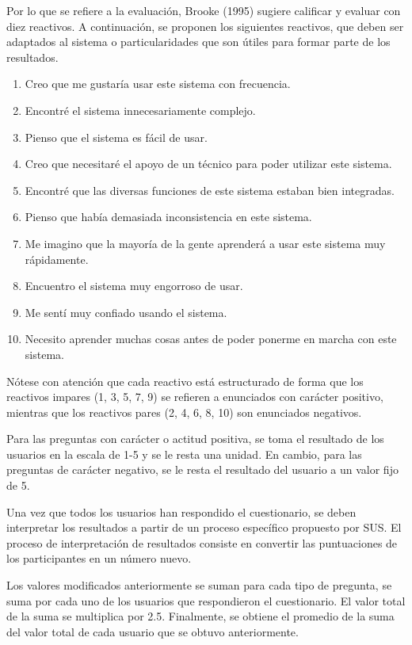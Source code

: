 Por lo que se refiere a la evaluación, Brooke (1995) sugiere calificar y evaluar con diez reactivos. A continuación, se proponen los siguientes reactivos, que deben ser adaptados al sistema o particularidades que son útiles para formar parte de los resultados.

\begin{enumerate}
  \item Creo que me gustaría usar este sistema con frecuencia.
  \item Encontré el sistema innecesariamente complejo.
  \item Pienso que el sistema es fácil de usar.
  \item Creo que necesitaré el apoyo de un técnico para poder utilizar este sistema.
  \item Encontré que las diversas funciones de este sistema estaban bien integradas.
  \item Pienso que había demasiada inconsistencia en este sistema.
  \item Me imagino que la mayoría de la gente aprenderá a usar este sistema muy rápidamente.
  \item Encuentro el sistema muy engorroso de usar.
  \item Me sentí muy confiado usando el sistema.
  \item Necesito aprender muchas cosas antes de poder ponerme en marcha con este sistema.
\end{enumerate}

Nótese con atención que cada reactivo está estructurado de forma que los reactivos impares (1, 3, 5, 7, 9) se refieren a enunciados con carácter positivo, mientras que los reactivos pares (2, 4, 6, 8, 10) son enunciados negativos.

Para las preguntas con carácter o actitud positiva, se toma el resultado de los usuarios en la escala de 1-5 y se le resta una unidad. En cambio, para las preguntas de carácter negativo, se le resta el resultado del usuario a un valor fijo de 5.

Una vez que todos los usuarios han respondido el cuestionario, se deben interpretar los resultados a partir de un proceso específico propuesto por SUS. El proceso de interpretación de resultados consiste en convertir las puntuaciones de los participantes en un número nuevo.

Los valores modificados anteriormente se suman para cada tipo de pregunta, se suma por cada uno de los usuarios que respondieron el cuestionario. El valor total de la suma se multiplica por 2.5. Finalmente, se obtiene el promedio de la suma del valor total de cada usuario que se obtuvo anteriormente.

